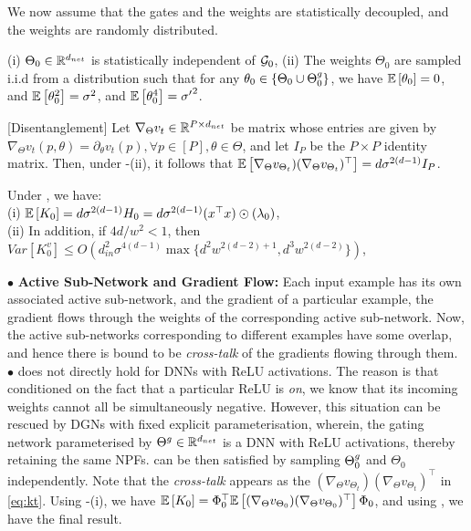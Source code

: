We now assume that the gates and the weights are statistically decoupled, and the weights are randomly distributed.
\begin{assumption}\label{assmp:main}
(i) $\Theta_0\in\mathbb{R}^{d_{net}}$ is statistically independent of $\mathcal{G}_0$, (ii) The weights $\Theta_0$ are sampled i.i.d from a distribution such that for any $\theta_0\in\{\Theta_0\cup {\Theta}^g_0\}$,  we have $\mathbb{E}\left[\theta_0\right]=0$, and  $\mathbb{E}\left[\theta^2_0\right]=\sigma^2$, and $\mathbb{E}\left[\theta^4_0\right]={\sigma'}^2$.
\end{assumption}
\begin{lemma}\label{lm:disentangle}[Disentanglement] Let $\nabla_{\Theta} v_t\in \mathbb{R}^{P\times d_{net}}$ be matrix whose entries are given by $\nabla_{\Theta} v_t (p,\theta)=\partial_{\theta}v_t(p),\forall p\in [P], \theta\in\Theta$, and let $I_P$ be the $P\times P$ identity matrix. Then, 
under -(ii), it follows that $\mathbb{E}\left[\nabla_{\Theta}v_{\Theta_t})(\nabla_{\Theta}v_{\Theta_t})^\top \right]= d\sigma^{2(d-1)}I_{P}$.
\end{lemma}
\begin{theorem}\label{th:main} Under , we have:\\
(i) $\mathbb{E}\left[K_0\right]=d\sigma^{2(d-1)}H_0=d\sigma^{2(d-1)}(x^\top x)\odot(\lambda_0)$,\\
(ii) In addition, if ${4d}/{w^2}<1$, then $Var\left[K^v_0\right]\leq O\left(d^2_{in}\sigma^{4(d-1)}\max\{d^2w^{2(d-2)+1}, d^3w^{2(d-2)}\}\right)$,\\
\end{theorem}
$\bullet$ \textbf{Active Sub-Network and Gradient Flow:} Each input example has its own associated active sub-network, and the gradient of  a particular example, the gradient flows through the weights of the corresponding active sub-network. Now, the active sub-networks corresponding to different examples have some overlap, and hence there is bound to be \emph{cross-talk} of the gradients flowing through them. \\
$\bullet$ \textbf{} does not directly hold for DNNs with ReLU activations. The reason is that conditioned on the fact that a particular ReLU is \emph{on}, we know that its incoming weights cannot all be simultaneously negative. However, this situation can be rescued by DGNs with fixed explicit parameterisation, wherein, the gating network parameterised by ${\Theta}^g\in\mathbb{R}^{d_{net}}$ is a DNN with ReLU activations, thereby retaining the same NPFs.  can be then satisfied by sampling ${\Theta}^g_0$ and $\Theta_0$ independently. Note that the \emph{cross-talk} appears as the $(\nabla_{\Theta}v_{\Theta_t})(\nabla_{\Theta}v_{\Theta_t})^\top$ in \eqref{eq:kt}. Using -(i), we have $\mathbb{E}\left[K_0\right]=\Phi^\top_0\mathbb{E}\left[(\nabla_{\Theta}v_{\Theta_0})(\nabla_{\Theta}v_{\Theta_0})^\top\right]\Phi_0$, and using , we have the final result.
